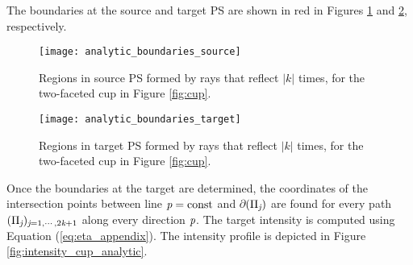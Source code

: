 %
The boundaries at the source and target PS are shown in red in Figures \ref{fig:boundary} and \ref{boundaries_target}, respectively. 
\begin{figure}[htbp]
\centering
\texttt{[image: analytic\_boundaries\_source]}
\caption{Regions in source PS formed by rays that reflect $|k|$ times, for the two-faceted cup in Figure \ref{fig:cup}.}
\label{fig:boundary}
\end{figure}
\begin{figure}[htbp]
\centering
\texttt{[image: analytic\_boundaries\_target]}
\caption{Regions in target PS formed by rays that reflect $|k|$ times, for the two-faceted cup in Figure \ref{fig:cup}.}
\label{boundaries_target}
\end{figure}
Once the boundaries at the target are determined, the coordinates of the intersection points between line $\textit{p}=\textrm{const}$ and $\partial$$(\Pi_{\textit{j}})$ are found for every path $(\Pi_{\textit{j}})_{\textit{j}=1, \cdots, 2\textit{k}+1}$ along every direction $\textit{p}$. The target intensity is computed using Equation (\ref{eq:eta_appendix}). The intensity profile is depicted in Figure \ref{fig:intensity_cup_analytic}. 
